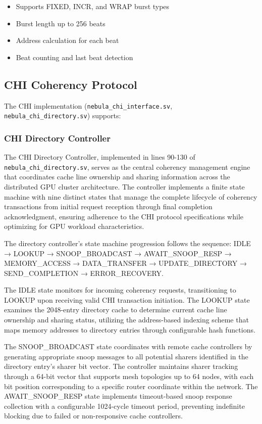\documentclass[12pt,letterpaper]{article}
\begin{document}
\begin{itemize}
    \item Supports FIXED, INCR, and WRAP burst types
    \item Burst length up to 256 beats
    \item Address calculation for each beat
    \item Beat counting and last beat detection
\end{itemize}

\subsection{CHI Coherency Protocol}

The CHI implementation (\texttt{nebula\_chi\_interface.sv}, \texttt{nebula\_chi\_directory.sv}) supports:

\subsubsection{CHI Directory Controller}

The CHI Directory Controller, implemented in lines 90-130 of \texttt{nebula\_chi\_directory.sv}, serves as the central coherency management engine that coordinates cache line ownership and sharing information across the distributed GPU cluster architecture. The controller implements a finite state machine with nine distinct states that manage the complete lifecycle of coherency transactions from initial request reception through final completion acknowledgment, ensuring adherence to the CHI protocol specifications while optimizing for GPU workload characteristics.

The directory controller's state machine progression follows the sequence: 
IDLE → LOOKUP → SNOOP\_BROADCAST → AWAIT\_SNOOP\_RESP → MEMORY\_ACCESS → DATA\_TRANSFER → UPDATE\_DIRECTORY → SEND\_COMPLETION → ERROR\_RECOVERY. 

The IDLE state monitors for incoming coherency requests, transitioning to LOOKUP upon receiving valid CHI transaction initiation. The LOOKUP state examines the 2048-entry directory cache to determine current cache line ownership and sharing status, utilizing the address-based indexing scheme that maps memory addresses to directory entries through configurable hash functions.

The SNOOP\_BROADCAST state coordinates with remote cache controllers by generating appropriate snoop messages to all potential sharers identified in the directory entry's sharer bit vector. The controller maintains sharer tracking through a 64-bit vector that supports mesh topologies up to 64 nodes, with each bit position corresponding to a specific router coordinate within the network. The AWAIT\_SNOOP\_RESP state implements timeout-based snoop response collection with a configurable 1024-cycle timeout period, preventing indefinite blocking due to failed or non-responsive cache controllers.
\end{document}

